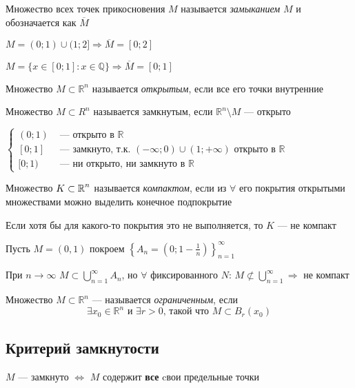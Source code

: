 \begin{center}
    
\end{center}


 Множество всех точек прикосновения $M$ называется \textit{замыканием} $M$ и обозначается как $\overline {M}$

\ex $M=(0;1)\cup(1;2]\Longrightarrow\overline{M}=[0;2]$

\ex $M=\{x\in[0;1]\colon x\in \mathbb{Q}\}\Longrightarrow\overline{M}=[0;1]$

 Множество $M\subset\mathbb{R}^n$ называется \textit{открытым}, если все его точки внутренние

 Множество $M\subset R^n$ называется замкнутым, если $\mathbb{R}^n\setminus M$ — открыто

\ex $\begin{cases}
    (0;1)&\text{ — открыто в $\mathbb{R}$}\\
    [0;1]&\text{ — замкнуто, т.к. $(-\infty;0)\cup(1;+\infty)$ открыто в $\mathbb{R}$}\\
    [0;1)&\text{ — ни открыто, ни замкнуто в $\mathbb{R}$}
\end{cases}$

 Множество $K\subset\operatorname{\mathbb{R}}^n$ называется \textit{компактом}, если из $\forall$ его покрытия открытыми множествами можно выделить конечное подпокрытие

\comment Если хотя бы для какого-то покрытия это не выполняется, то $K$ — не компакт

\ex Пусть $M=(0,1)$ покроем $\left\{A_n=\left(0;1-\frac{1}{n}\right)\right\}_{n=1}^\infty$

При $n\rightarrow\infty$ $M\subset \displaystyle\bigcup_{n=1}^\infty A_n$, но $\forall$ фиксированного $N$: $M\not\subset\displaystyle\bigcup_{n=1}^{\infty}\Longrightarrow$ не компакт

 Множество $M\subset \mathbb{R}^n$ — называется \textit{ограниченным}, если $$\exists x_0\in\mathbb{R}^n\text{ и }\exists r>0\text{, такой что }M\subset B_{r}(x_0)$$

\subsection{Критерий замкнутости}

\theorem $M$ — замкнуто $\Longleftrightarrow$ $M$ содержит \textbf{все} cвои предельные точки

